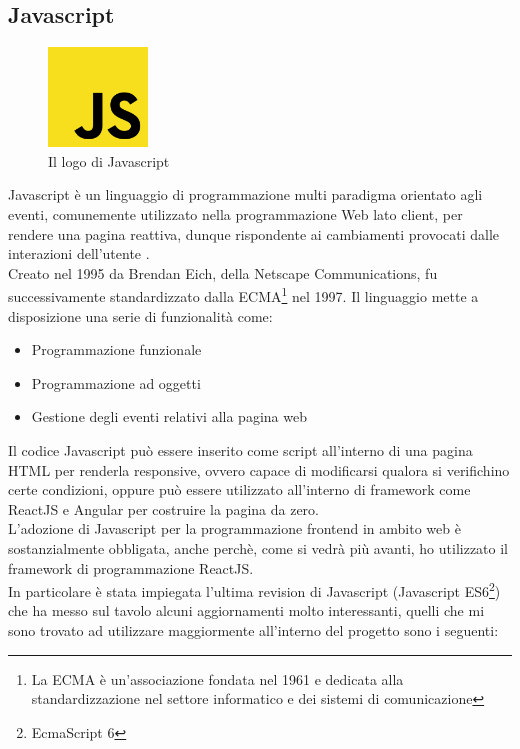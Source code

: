 \subsection{Javascript}
\begin{figure}[h]
    \centering
    \includegraphics[width=100px, height=100px]{./images/Javascript.png}
    \caption{Il logo di Javascript}
    \label{fig:JavaScript}
\end{figure}
Javascript è un linguaggio di programmazione multi paradigma orientato agli eventi, comunemente utilizzato nella programmazione Web lato client, per rendere una pagina reattiva, dunque rispondente ai cambiamenti provocati dalle interazioni dell'utente \cite{JavaScriptDef}. 
\\
Creato nel 1995 da Brendan Eich, della Netscape Communications, fu successivamente standardizzato dalla ECMA\footnote{
La ECMA è un'associazione fondata nel 1961 e dedicata alla standardizzazione nel settore informatico e dei sistemi di comunicazione\cite{ECMAinternational}
} nel 1997. Il linguaggio mette a disposizione una serie di funzionalità come:
\begin{itemize}
    \item Programmazione funzionale
    \item Programmazione ad oggetti
    \item Gestione degli eventi relativi alla pagina web
\end{itemize}
Il codice Javascript può essere inserito come script all'interno di una pagina HTML per renderla responsive, ovvero capace di modificarsi qualora si verifichino certe condizioni, oppure può essere utilizzato all'interno di framework come ReactJS e Angular per costruire la pagina da zero.
\\
L'adozione di Javascript per la programmazione frontend in ambito web è sostanzialmente obbligata, anche perchè, come si vedrà più avanti, ho utilizzato il framework di programmazione ReactJS.
\\
In particolare è stata impiegata l'ultima revision di Javascript (Javascript ES6\footnote{EcmaScript 6}) che ha messo sul tavolo alcuni aggiornamenti molto interessanti, quelli che mi sono trovato ad utilizzare maggiormente all'interno del progetto sono i seguenti:
